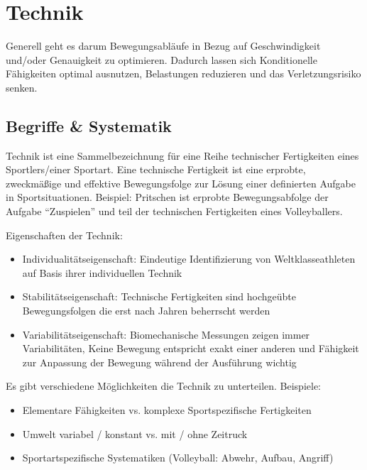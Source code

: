 
\section{Technik}

Generell geht es darum Bewegungsabläufe in Bezug auf Geschwindigkeit und/oder Genauigkeit zu optimieren. Dadurch lassen sich Konditionelle Fähigkeiten optimal ausnutzen, Belastungen reduzieren und das Verletzungsrisiko senken.

\subsection{Begriffe \& Systematik}

Technik ist eine Sammelbezeichnung für eine Reihe technischer Fertigkeiten eines Sportlers/einer Sportart. Eine technische Fertigkeit ist eine erprobte, zweckmäßige und effektive Bewegungsfolge zur Lösung einer definierten Aufgabe in Sportsituationen. Beispiel: Pritschen ist erprobte Bewegungsabfolge der Aufgabe ``Zuspielen'' und teil der technischen Fertigkeiten eines Volleyballers.

Eigenschaften der Technik:
\begin{itemize}
    \item Individualitätseigenschaft: Eindeutige Identifizierung von Weltklasseathleten auf Basis ihrer individuellen Technik
    \item Stabilitätseigenschaft: Technische Fertigkeiten sind hochgeübte Bewegungsfolgen die erst nach Jahren beherrscht werden
    \item Variabilitätseigenschaft: Biomechanische Messungen zeigen immer Variabilitäten, Keine Bewegung entspricht exakt einer anderen und Fähigkeit zur Anpassung der Bewegung während der Ausführung wichtig
\end{itemize}

Es gibt verschiedene Möglichkeiten die Technik zu unterteilen.
Beispiele:
\begin{itemize}
    \item Elementare Fähigkeiten vs. komplexe Sportspezifische Fertigkeiten
    \item Umwelt variabel / konstant vs. mit / ohne Zeitruck
    \item  Sportartspezifische Systematiken (Volleyball: Abwehr, Aufbau, Angriff)
\end{itemize}

